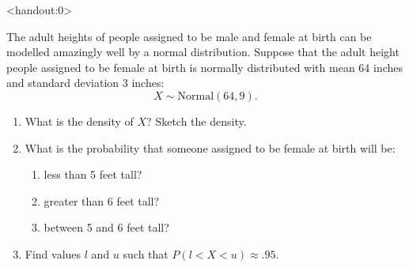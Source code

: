 \begin{frame}<handout:0>
  \begin{block}{\examplectd}
    The adult heights of people assigned to be male and female at birth can be modelled amazingly well by a normal distribution. Suppose that the adult height people assigned to be female at birth is normally distributed with mean 64 inches and standard deviation 3 inches:
    \[
      X \sim \mbox{Normal}(64,9).
    \]
    
    \begin{enumerate}[label=\alph*),start=1]
    \item What is the density of $X$? Sketch the density.
    \item What is the probability that someone assigned to be female at birth will be:
      \begin{enumerate}[label=\roman*),start=1]
      \item less than 5 feet tall? 
      \item greater than 6 feet tall?
      \item between 5 and 6 feet tall?
      \end{enumerate}
    \item Find values $l$ and $u$ such that $P(l < X < u) \approx .95$. 
    \end{enumerate}
  \end{block}
\end{frame}

